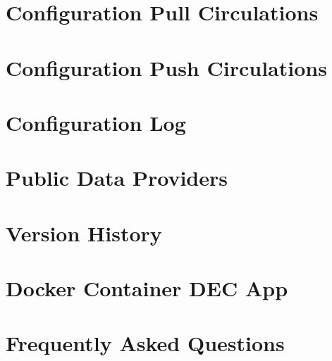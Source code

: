 \documentclass[
	oneside,
	openany,
	a4paper,
	headings=optiontoheadandtoc
	]{book}
\begin{document}
\chapter{Configuration Pull Circulations}
 

\chapter{Configuration Push Circulations}
 

\chapter{Configuration Log}

 
\chapter{Public Data Providers}


\chapter{Version History}


\chapter{Docker Container DEC App}

 
\chapter{Frequently Asked Questions}

	
\end{document}
